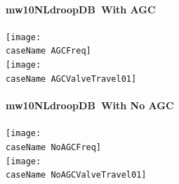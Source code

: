 \documentclass[12pt]{article}
\newcommand{\caseName}{ }
\begin{document}
\renewcommand{\caseName}{mw10NLdroopDB}
\paragraph{\caseName\ With AGC} 
\begin{center}
	\texttt{[image: \\caseName AGCFreq]}\\
	\texttt{[image: \\caseName AGCValveTravel01]} \\
\end{center}
\paragraph{\caseName\ With No AGC} 
\begin{center}
	\texttt{[image: \\caseName NoAGCFreq]} \\
	\texttt{[image: \\caseName NoAGCValveTravel01]} 
\end{center}
\pagebreak



\end{document}
